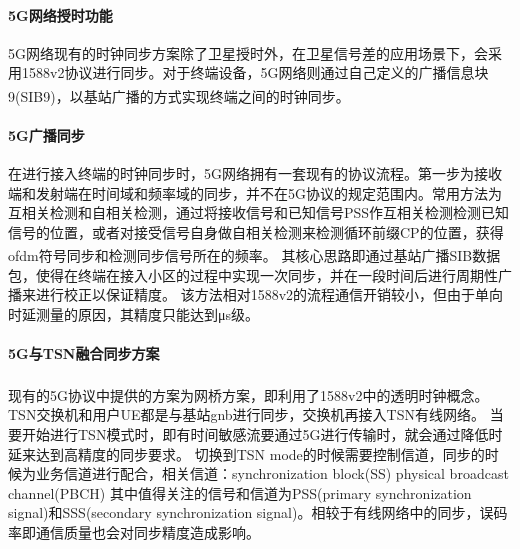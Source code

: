 \documentclass[UTF8,a4paper,12pt]{ctexart}
\numberwithin{equation}{section}
\begin{document}
\paragraph{5G网络授时功能}
5G网络现有的时钟同步方案除了卫星授时外，在卫星信号差的应用场景下，会采用1588v2协议进行同步。对于终端设备，5G网络则通过自己定义的广播信息块9(SIB9)，以基站广播的方式实现终端之间的时钟同步\textsuperscript{\cite{schungel2021optimized}}。

\paragraph{5G广播同步}


在进行接入终端的时钟同步时，5G网络拥有一套现有的协议流程。第一步为接收端和发射端在时间域和频率域的同步，并不在5G协议的规定范围内。常用方法为互相关检测和自相关检测，通过将接收信号和已知信号PSS作互相关检测检测已知信号的位置，或者对接受信号自身做自相关检测来检测循环前缀CP的位置，获得ofdm符号同步和检测同步信号所在的频率\textsuperscript{\cite{goodarzi2020synchronization}}。
其核心思路即通过基站广播SIB数据包，使得在终端在接入小区的过程中实现一次同步，并在一段时间后进行周期性广播来进行校正以保证精度。
该方法相对1588v2的流程通信开销较小，但由于单向时延测量的原因，其精度只能达到μs级。
\begin{figure}[htb] 
\end{figure}
\paragraph{5G与TSN融合同步方案}
现有的5G协议中提供的方案为网桥方案\textsuperscript{\cite{nikhileswar2022traffic}}，即利用了1588v2中的透明时钟概念。TSN交换机和用户UE都是与基站gnb进行同步，交换机再接入TSN有线网络。
当要开始进行TSN模式时，即有时间敏感流要通过5G进行传输时，就会通过降低时延来达到高精度的同步要求。
切换到TSN mode的时候需要控制信道，同步的时候为业务信道进行配合，相关信道：synchronization block(SS)   physical broadcast channel(PBCH)
其中值得关注的信号和信道为PSS(primary synchronization signal)和SSS(secondary synchronization signal)。相较于有线网络中的同步，误码率即通信质量也会对同步精度造成影响。
\end{document}
